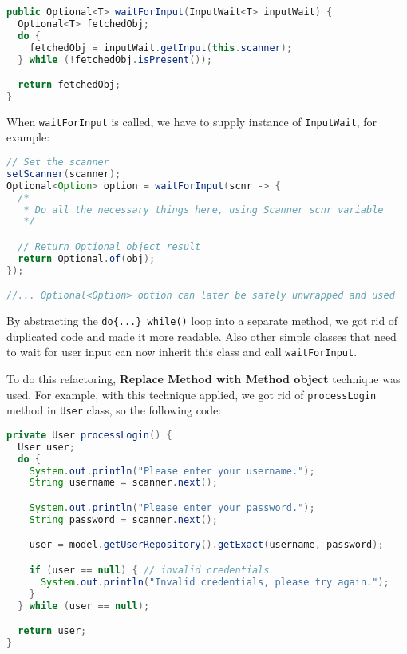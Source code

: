\documentclass{article}
\renewcommand{\b}[1]{\textbf{#1}}
\newcommand{\code}[1]{\texttt{#1}}
\begin{document}
\begin{lstlisting}[language=Java]
public Optional<T> waitForInput(InputWait<T> inputWait) {
  Optional<T> fetchedObj;
  do {
    fetchedObj = inputWait.getInput(this.scanner);
  } while (!fetchedObj.isPresent());

  return fetchedObj;
}
\end{lstlisting}

When \code{waitForInput} is called, we have to supply instance of \code{InputWait}, for example:

\begin{lstlisting}[language=Java]
// Set the scanner
setScanner(scanner);
Optional<Option> option = waitForInput(scnr -> {
  /*
   * Do all the necessary things here, using Scanner scnr variable
   */

  // Return Optional object result
  return Optional.of(obj);
});

//... Optional<Option> option can later be safely unwrapped and used
\end{lstlisting}

By abstracting the \code{do\{...\} while()} loop into a separate method, we got rid of duplicated code and made it more readable. Also other simple classes that need to wait for user input can now inherit this class and call \code{waitForInput}.

To do this refactoring, \b{Replace Method with Method object} technique was used. For example, with this technique applied, we got rid of \code{processLogin} method in \code{User} class, so the following code:

\begin{lstlisting}[language=Java]
private User processLogin() {
  User user;
  do {
    System.out.println("Please enter your username.");
    String username = scanner.next();

    System.out.println("Please enter your password.");
    String password = scanner.next();

    user = model.getUserRepository().getExact(username, password);

    if (user == null) { // invalid credentials
      System.out.println("Invalid credentials, please try again.");
    }
  } while (user == null);

  return user;
}
\end{lstlisting}
\end{document}
